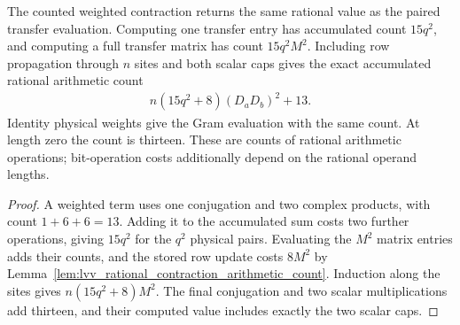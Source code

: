 \begin{lemma}
    \label{lem:lvv_rational_weighted_overlap_arithmetic_count}
    \leanok
    The counted weighted contraction returns the same rational value as
    the paired transfer evaluation. Computing one transfer entry has
    accumulated count $15q^2$, and computing a full transfer matrix has
    count $15q^2M^2$. Including row propagation through $n$ sites and both
    scalar caps gives the exact accumulated rational arithmetic count
    \begin{align*}
        n(15q^2+8)(D_aD_b)^2+13.
    \end{align*}
    Identity physical weights give the Gram evaluation with the same
    count. At length zero the count is thirteen.
    These are counts of rational arithmetic operations; bit-operation
    costs additionally depend on the rational operand lengths.
\end{lemma}
\begin{proof}\leanok
    A weighted term uses one conjugation and two complex products,
    with count $1+6+6=13$. Adding it to the accumulated sum costs two
    further operations, giving $15q^2$ for the $q^2$ physical pairs.
    Evaluating the $M^2$ matrix entries adds their counts, and the stored
    row update costs $8M^2$ by
    Lemma~\ref{lem:lvv_rational_contraction_arithmetic_count}.
    Induction along the sites gives $n(15q^2+8)M^2$.
    The final conjugation and two scalar multiplications add thirteen,
    and their computed value includes exactly the two scalar caps.
\end{proof}

